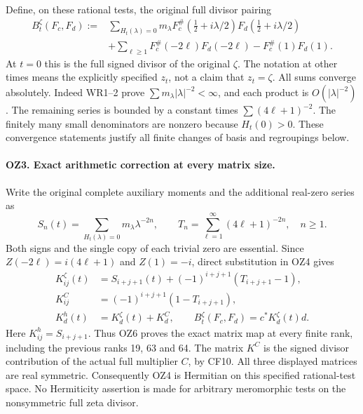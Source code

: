 Define, on these rational tests, the original full divisor pairing
\[
 \begin{split}
 B_t^\zeta(F_c,F_d)
  :={}&\sum_{H_t(\lambda)=0}m_\lambda
       F_c^\#(\tfrac12+i\lambda/2)F_d(\tfrac12+i\lambda/2)\\
   &+\sum_{\ell\ge1}F_c^\#(-2\ell)F_d(-2\ell)
       -F_c^\#(1)F_d(1).
 \end{split}\tag{OZ4}
\]
At \(t=0\) this is the full signed divisor of the original
\(\zeta\). The notation at other times means the explicitly
specified \(z_t\), not a claim that \(z_t=\zeta\).
All sums converge absolutely. Indeed WR1--2 prove
\(\sum m_\lambda|\lambda|^{-2}<\infty\), and each product
is \(O(|\lambda|^{-2})\). The remaining series is bounded by
a constant times \(\sum(4\ell+1)^{-2}\). The finitely many
small denominators are nonzero because \(H_t(0)>0\).
These convergence statements justify all finite changes of basis
and regroupings below.

\paragraph{OZ3. Exact arithmetic correction at every matrix size.}
Write the original complete auxiliary moments and the additional
real-zero series as
\[
 S_n(t)=\sum_{H_t(\lambda)=0}m_\lambda\lambda^{-2n},\qquad
 T_n=\sum_{\ell=1}^\infty(4\ell+1)^{-2n},\quad n\ge1.
                                                               \tag{OZ5}
\]
Both signs and the single copy of each trivial zero are essential.
Since \(Z(-2\ell)=i(4\ell+1)\) and \(Z(1)=-i\), direct
substitution in OZ4 gives
\[
 \begin{split}
 K_{ij}^\zeta(t)&=S_{i+j+1}(t)
             +(-1)^{i+j+1}(T_{i+j+1}-1),\\
 K_{ij}^{C}&=(-1)^{i+j+1}(1-T_{i+j+1}),\\
 K^h_d(t)&=K^\zeta_d(t)+K^C_d,\qquad
 B_t^\zeta(F_c,F_d)=c^*K_d^\zeta(t)d .
 \end{split}\tag{OZ6}
\]
Here \(K^h_{ij}=S_{i+j+1}\). Thus OZ6 proves the exact matrix
map at every finite rank, including the previous ranks 19, 63 and
64. The matrix \(K^C\) is the signed divisor contribution of the
actual full multiplier \(C\), by CF10. All three displayed
matrices are real symmetric. Consequently OZ4 is Hermitian on
this specified rational-test space. No Hermiticity assertion is
made for arbitrary meromorphic tests on the nonsymmetric full
zeta divisor.

